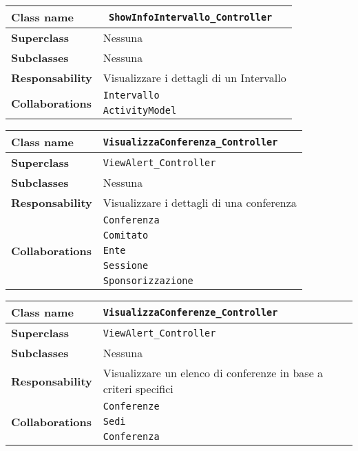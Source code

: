 \begin{table}[h!]
	\begin{tabular}{|l|l|}
		\hline 
		\textbf{Class name} &\texttt{ ShowInfoIntervallo\_Controller}
		\\ \hline
		\textbf{Superclass} & Nessuna
		\\ \hline
		\multirow{1}{*}{\textbf{Subclasses}} & Nessuna
		\\ \hline
		\textbf{Responsability} & Visualizzare i dettagli di un Intervallo
		\\ \hline
		\multirow{2}{*}{\textbf{Collaborations}} & \texttt{Intervallo}\\
		& \texttt{ActivityModel}
		\\ \hline
	\end{tabular}
\end{table} 

\begin{table}[h!]
	\begin{tabular}{|l|l|}
		\hline 
		\textbf{Class name} & \texttt{VisualizzaConferenza\_Controller}
		\\ \hline
		\textbf{Superclass} & \texttt{ViewAlert\_Controller}
		\\ \hline
		\multirow{1}{*}{\textbf{Subclasses}} & Nessuna
		\\ \hline
		\textbf{Responsability} & Visualizzare i dettagli di una conferenza
		\\ \hline
		\multirow{5}{*}{\textbf{Collaborations}} & \texttt{Conferenza}\\
		& \texttt{Comitato}\\
		& \texttt{Ente} \\
		& \texttt{Sessione} \\
		& \texttt{Sponsorizzazione}
		\\ \hline
	\end{tabular}
\end{table} 

\begin{table}[h!]
	\begin{tabular}{|l|l|}
		\hline 
		\textbf{Class name} & \texttt{VisualizzaConferenze\_Controller}
		\\ \hline
		\textbf{Superclass} & \texttt{ViewAlert\_Controller}
		\\ \hline
		\multirow{1}{*}{\textbf{Subclasses}} & Nessuna
		\\ \hline
		\textbf{Responsability} & Visualizzare un elenco di conferenze in base a criteri specifici
		\\ \hline
		\multirow{3}{*}{\textbf{Collaborations}} &\texttt{Conferenze}\\
		& \texttt{Sedi}\\
		& \texttt{Conferenza}
		\\ \hline
	\end{tabular}
\end{table} 

